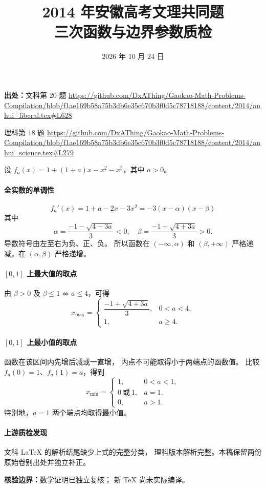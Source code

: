 \documentclass[UTF8,a4paper,11pt]{ctexart}
\title{2014 年安徽高考文理共同题\\三次函数与边界参数质检}
\date{2026 年 10 月 24 日}
\begin{document}
\maketitle
\noindent\textbf{出处：}文科第 20 题 \url{https://github.com/DxAThing/Gaokao-Math-Problems-Compilation/blob/f1ae169b58a75b3db6e35c670b3f0d5c78718188/content/2014/anhui_liberal.tex#L628}

理科第 18 题 \url{https://github.com/DxAThing/Gaokao-Math-Problems-Compilation/blob/f1ae169b58a75b3db6e35c670b3f0d5c78718188/content/2014/anhui_science.tex#L279}

设 $f_a(x)=1+(1+a)x-x^2-x^3$，其中 $a>0$。
\paragraph{全实数的单调性}
\[
 f_a'(x)=1+a-2x-3x^2=-3(x-\alpha)(x-\beta)
\]
其中
\[
 \alpha=\frac{-1-\sqrt{4+3a}}3<0,\quad
 \beta=\frac{-1+\sqrt{4+3a}}3>0.
\]
导数符号由左至右为负、正、负。
所以函数在 $(-\infty,\alpha)$ 和
$(\beta,+\infty)$ 严格递减，在 $(\alpha,\beta)$ 严格递增。

\paragraph{$[0,1]$ 上最大值的取点}
由 $\beta>0$ 及
$\beta\le1\Longleftrightarrow a\le4$，可得
\[
 x_{\max}=
 \begin{cases}
  \dfrac{-1+\sqrt{4+3a}}3,&0<a<4,\\[2mm]
  1,&a\ge4.
 \end{cases}
\]

\paragraph{$[0,1]$ 上最小值的取点}
函数在该区间内先增后减或一直增，
内点不可能取得小于两端点的函数值。
比较 $f_a(0)=1$、$f_a(1)=a$，得到
\[
 x_{\min}=
 \begin{cases}
  1,&0<a<1,\\
  0\ \text{或}\ 1,&a=1,\\
  0,&a>1.
 \end{cases}
\]
特别地，$a=1$ 两个端点均取得最小值。

\paragraph{上游质检发现}
文科 LaTeX 的解析结尾缺少上式的完整分类，
理科版本解析完整。本稿保留两份原始卷别出处并独立补正。

\noindent\textbf{核验边界：}数学证明已独立复核；
新 TeX 尚未实际编译。
\end{document}
